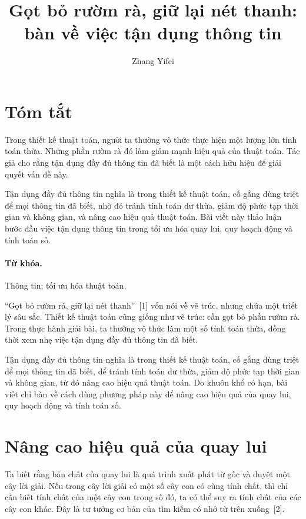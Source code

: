 \documentclass[11pt]{article}
\title{Gọt bỏ rườm rà, giữ lại nét thanh: bàn về việc tận dụng thông tin}
\author{Zhang Yifei}
\date{}
\begin{document}
\maketitle


\section*{Tóm tắt}

Trong thiết kế thuật toán, người ta thường vô thức thực hiện một lượng lớn
tính toán thừa. Những phần rườm rà đó làm giảm mạnh hiệu quả của thuật toán.
Tác giả cho rằng tận dụng đầy đủ thông tin đã biết là một cách hữu hiệu để
giải quyết vấn đề này.

Tận dụng đầy đủ thông tin nghĩa là trong thiết kế thuật toán, cố gắng dùng
triệt để mọi thông tin đã biết, nhờ đó tránh tính toán dư thừa, giảm độ phức
tạp thời gian và không gian, và nâng cao hiệu quả thuật toán. Bài viết này
thảo luận bước đầu việc tận dụng thông tin trong tối ưu hóa quay lui, quy
hoạch động và tính toán số.

\paragraph{Từ khóa.}
Thông tin; tối ưu hóa thuật toán.

``Gọt bỏ rườm rà, giữ lại nét thanh''~[1] vốn nói về vẽ trúc, nhưng chứa một
triết lý sâu sắc. Thiết kế thuật toán cũng giống như vẽ trúc: cần gọt bỏ phần
rườm rà. Trong thực hành giải bài, ta thường vô thức làm một số tính toán
thừa, đồng thời xem nhẹ việc tận dụng đầy đủ thông tin đã biết.

Tận dụng đầy đủ thông tin nghĩa là trong thiết kế thuật toán, cố gắng dùng
triệt để mọi thông tin đã biết, để tránh tính toán dư thừa, giảm độ phức tạp
thời gian và không gian, từ đó nâng cao hiệu quả thuật toán. Do khuôn khổ có
hạn, bài viết chỉ bàn về cách dùng phương pháp này để nâng cao hiệu quả của
quay lui, quy hoạch động và tính toán số.

\section{Nâng cao hiệu quả của quay lui}

Ta biết rằng bản chất của quay lui là quá trình xuất phát từ gốc và duyệt một
cây lời giải. Nếu trong cây lời giải có một số cây con có cùng tính chất, thì
chỉ cần biết tính chất của một cây con trong số đó, ta có thể suy ra tính
chất của các cây con khác. Đây là tư tưởng cơ bản của tìm kiếm có nhớ từ trên
xuống~[2].
\end{document}
